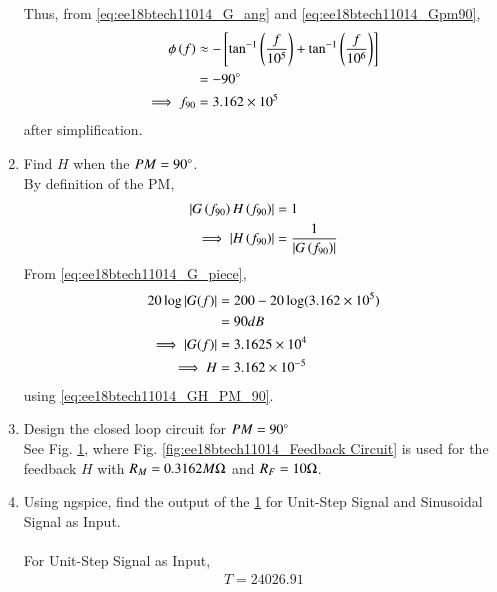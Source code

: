 \begin{enumerate}[label=\thesection.\arabic*.,ref=\thesection.\theenumi]
Thus, from  \eqref{eq:ee18btech11014_G_ang} and \eqref{eq:ee18btech11014_Gpm90},
%
\begin{align}
\phi\left(f\right) &\approx
-{}\left[\tan ^{-1}\left(\frac{f}{10^{5}}\right)+\tan ^{-1}\left(\frac{f}{10^{6}}\right)\right]
\\
&= -90 \degree
\\
\implies f_{90} &= 3.162 \times 10^{5}
\end{align}
after simplification.
\item Find $H$ when the $PM = 90 \degree$.
\\
\solution By definition of the PM, 
\begin{align}
\left\vert G\left(f_{90}\right)H\left(f_{90}\right)\right\vert &=1
\\
\implies \left\vert H\left(f_{90}\right)\right\vert &=\frac{1}{\left\vert G\left(f_{90}\right)\right\vert}
\label{eq:ee18btech11014_GH_PM_90}
\end{align}
%
From \eqref{eq:ee18btech11014_G_piece},
\begin{align}
20 \log \left\vert G(f)\right\vert &= 200 - 20\log(3.162 \times 10^{5})\\
&= 90 dB \\
\implies \left\vert G(f)\right\vert &= 3.1625 \times 10^{4}
\\
\implies H &= 3.162 \times 10^{-5}
\end{align}
using \eqref{eq:ee18btech11014_GH_PM_90}.
\item Design the closed loop circuit for $PM = 90 \degree$
\\
\solution See Fig. 	\ref{fig:ee18btech11014_Closed-Loop Circuit alpha=90}, where Fig. 	\ref{fig:ee18btech11014_Feedback Circuit} is used for the feedback $H$ with $R_M = 0.3162 M \ohm$ and 	$R_F = 10 \ohm$.

\begin{figure}[ht!]
	\begin{center}
		\resizebox{\columnwidth}{!}{}
	\end{center}
	\caption{}
	\label{fig:ee18btech11014_Closed-Loop Circuit alpha=90}
\end{figure}

\item Using ngspice, find the output of the \ref{fig:ee18btech11014_Closed-Loop Circuit alpha=90} for Unit-Step Signal and Sinusoidal Signal as Input.\\
\solution\\
For Unit-Step Signal as Input,
\begin{align}
T = 24026.91
\end{align}


\end{enumerate}
